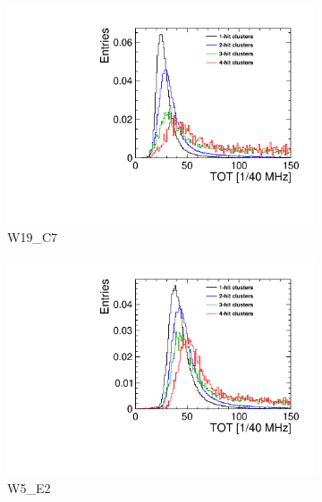 \begin{figure}[htbp] \centering
  \begin{subfigure}[b]{0.33\textwidth}
    \includegraphics[width=\textwidth]{./figures/Calibration/TOT_Clusters_W0019_C07.pdf}
    \caption{W19\_C7}
  \end{subfigure} \hfill
  \begin{subfigure}[b]{0.33\textwidth}
    \includegraphics[width=\textwidth]{./figures/Calibration/TOT_Clusters_W0005_E02.pdf}
    \caption{W5\_E2}
  \end{subfigure}\hfill
  \begin{subfigure}[b]{0.33\textwidth}

\end{subfigure}
\end{figure}
